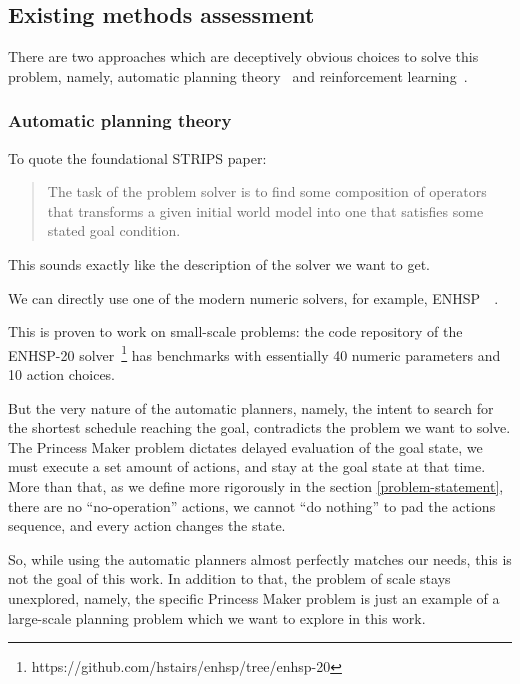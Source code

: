 \documentclass[11pt, a4paper]{article}
\begin{document}
	\subsection{Existing methods assessment}\label{introduction:assessment}

	There are two approaches which are deceptively obvious choices to solve this problem, namely, automatic planning theory~\cite{fikes1971strips} and reinforcement learning~\cite{sutton2018reinforcement}.
	
  \subsubsection{Automatic planning theory}
  
  To quote the foundational STRIPS paper:
  
  \blockcquote[p.~190]{fikes1971strips}
  {The task of the problem solver is to find some composition of operators that transforms a given initial world model into one that satisfies some stated goal condition.}
  
  This sounds exactly like the description of the solver we want to get.
  
	We can directly use one of the modern numeric solvers, for example, ENHSP~\cite{enhsp::scala2020subgoaling}~\cite{enhsp::Scala2016IntervalBasedRF}.
	
	This is proven to work on small-scale problems: the code repository of the ENHSP-20 solver~\footnote{https://github.com/hstairs/enhsp/tree/enhsp-20} has benchmarks with essentially 40 numeric parameters and 10 action choices.
	
	But the very nature of the automatic planners, namely, the intent to search for the shortest schedule reaching the goal, contradicts the problem we want to solve.
	The Princess Maker problem dictates delayed evaluation of the goal state, we must execute a set amount of actions, and stay at the goal state at that time.
	More than that, as we define more rigorously in the section \ref{problem-statement}, there are no ``no-operation'' actions, we cannot ``do nothing'' to pad the actions sequence, and every action changes the state.
	
	So, while using the automatic planners almost perfectly matches our needs, this is not the goal of this work.
	In addition to that, the problem of scale stays unexplored, namely, the specific Princess Maker problem is just an example of a large-scale planning problem which we want to explore in this work.
\end{document}
